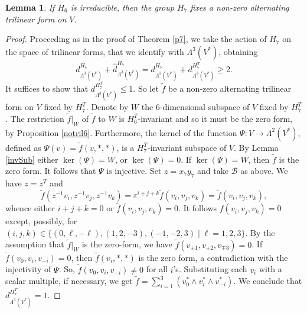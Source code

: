 \documentclass{amsart}
\newtheorem{lemma}{Lemma}[section]
\theoremstyle{remark}
\begin{document}
 

\begin{lemma}\label{Scott}
If $H_6$ is  irreducible, then
the group $H_7$  fixes a non-zero alternating trilinear form on $V$. 
\end{lemma}

\begin{proof}
Proceeding as in the proof of  Theorem \ref{p7}, we take the action of $H_7$ on the space
of trilinear forms, that we identify with $\Lambda^3(V^*)$, obtaining  
$$d_{\Lambda^ 3(V^\ast)}^ {H_7}+\hat d_{\Lambda^ 3(V^\ast)}^{H_7}=d_{\Lambda^ 3(V^\ast)}^
{H_7}+d_{\Lambda^ 3(V^\ast)}^{H_7^T} \geq 2.$$
It suffices to show that $d_{\Lambda^ 3(V^\ast)}^{H_7^T}\le 1$.
So let $\tilde f$ be a non-zero alternating trilinear form on $V$
fixed by $H_7^ T$. 
Denote by $W$ the $6$-dimensional subspace of $V$ fixed by $H_7^ T$.
The restriction $\tilde f|_W$ of $\tilde f$ to $W$ is $ H_6^ T$-invariant and so it must
be the zero form, by Proposition \ref{notril6}. 
Furthermore, the kernel of the function $\Psi: V \rightarrow \Lambda^ 2 (V^ \ast)$,
defined
as $\Psi(v)=\tilde f(v,\ast,\ast)$, is a $H_7^ T$-invariant subspace of $V$. 
By Lemma \ref{invSub} either $\ker(\Psi)=W$, or $\ker(\Psi)=0$. 
If $\ker(\Psi)=W$, then $\tilde f$ is the
zero form. It follows that $\Psi$ is
injective.
Set $z=x_7y_7$ and take 
$\mathcal{B}$ as above.
We have $z=z^ T$ and
$$\tilde f( z^ {-1}v_i,z^ {-1} v_j,z^ {-1}v_k)={\varepsilon}^{i+j+k}\tilde f(v_i,v_j,v_k)=\tilde
f(v_i,v_j,v_k),$$
whence either $i+j+k=0$ or $\tilde f(v_i,v_j,v_k)=0$. 
It follows $f(v_i,v_j,v_k)=0$ except, possibly, for 
$(i,j,k)\in \{(0,\ell,-\ell), (1,2,-3),(-1,-2,3) \mid \ell=1,2,3\}$.
By the assumption that $\tilde f|_W$ is the zero-form, 
we have $\tilde f(v_{\pm 1},v_{\pm 2},v_{\mp 3})=0$.
If $\tilde f(v_0,v_i,v_{-i})=0$, then $\tilde f(v_i,\ast,\ast)$ is the zero form, a contradiction
with the injectivity of $\Psi$. So, $\tilde f(v_0,v_i,v_{-i})\neq 0$ for all $i$'s. 
Substituting each $v_i$ with a scalar multiple, if necessary, we get
$\tilde f=\sum_{i=1}^3\left( v_0^\ast\wedge
v_i^\ast\wedge v_{-i}^\ast\right)$. We conclude that  $d_{\Lambda^3(V^\ast)}^{H_7^T}=
1$.
\end{proof}
\end{document}

